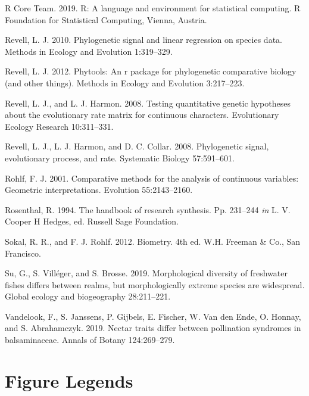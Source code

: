 \documentclass[
]{article}
\begin{document}
\leavevmode\hypertarget{ref-RCT}{}%
R Core Team. 2019. R: A language and environment for statistical
computing. R Foundation for Statistical Computing, Vienna, Austria.

\leavevmode\hypertarget{ref-Revell2010}{}%
Revell, L. J. 2010. Phylogenetic signal and linear regression on species
data. Methods in Ecology and Evolution 1:319--329.

\leavevmode\hypertarget{ref-Revell2012}{}%
Revell, L. J. 2012. Phytools: An r package for phylogenetic comparative
biology (and other things). Methods in Ecology and Evolution 3:217--223.

\leavevmode\hypertarget{ref-RevellHarmon2008}{}%
Revell, L. J., and L. J. Harmon. 2008. Testing quantitative genetic
hypotheses about the evolutionary rate matrix for continuous characters.
Evolutionary Ecology Research 10:311--331.

\leavevmode\hypertarget{ref-Revell_et_al2008}{}%
Revell, L. J., L. J. Harmon, and D. C. Collar. 2008. Phylogenetic
signal, evolutionary process, and rate. Systematic Biology 57:591--601.

\leavevmode\hypertarget{ref-Rohlf2001}{}%
Rohlf, F. J. 2001. Comparative methods for the analysis of continuous
variables: Geometric interpretations. Evolution 55:2143--2160.

\leavevmode\hypertarget{ref-Rosenthal1994}{}%
Rosenthal, R. 1994. The handbook of research synthesis. Pp. 231--244
\emph{in} L. V. Cooper H Hedges, ed. Russell Sage Foundation.

\leavevmode\hypertarget{ref-SokalRohlf2012}{}%
Sokal, R. R., and F. J. Rohlf. 2012. Biometry. 4th ed. W.H. Freeman \&
Co., San Francisco.

\leavevmode\hypertarget{ref-Su2019}{}%
Su, G., S. Villéger, and S. Brosse. 2019. Morphological diversity of
freshwater fishes differs between realms, but morphologically extreme
species are widespread. Global ecology and biogeography 28:211--221.

\leavevmode\hypertarget{ref-Vandelook2019}{}%
Vandelook, F., S. Janssens, P. Gijbels, E. Fischer, W. Van den Ende, O.
Honnay, and S. Abrahamczyk. 2019. Nectar traits differ between
pollination syndromes in balsaminaceae. Annals of Botany 124:269--279.

\newpage

\hypertarget{figure-legends}{%
\section{Figure Legends}\label{figure-legends}}
\end{document}
